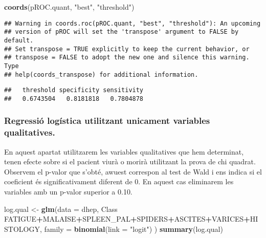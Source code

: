 \documentclass[]{article}
\newenvironment{Shaded}{\begin{snugshade}}{\end{snugshade}}
\newcommand{\DataTypeTok}[1]{\textcolor[rgb]{0.13,0.29,0.53}{#1}}
\newcommand{\KeywordTok}[1]{\textcolor[rgb]{0.13,0.29,0.53}{\textbf{#1}}}
\newcommand{\NormalTok}[1]{#1}
\newcommand{\OperatorTok}[1]{\textcolor[rgb]{0.81,0.36,0.00}{\textbf{#1}}}
\newcommand{\StringTok}[1]{\textcolor[rgb]{0.31,0.60,0.02}{#1}}
\begin{document}
\begin{Shaded}
\begin{Highlighting}[]
\KeywordTok{coords}\NormalTok{(pROC.quant, }\StringTok{"best"}\NormalTok{, }\StringTok{"threshold"}\NormalTok{)}
\end{Highlighting}
\end{Shaded}

\begin{verbatim}
## Warning in coords.roc(pROC.quant, "best", "threshold"): An upcoming
## version of pROC will set the 'transpose' argument to FALSE by default.
## Set transpose = TRUE explicitly to keep the current behavior, or
## transpose = FALSE to adopt the new one and silence this warning. Type
## help(coords_transpose) for additional information.
\end{verbatim}

\begin{verbatim}
##   threshold specificity sensitivity 
##   0.6743504   0.8181818   0.7804878
\end{verbatim}

\hypertarget{regressiuxf3-loguxedstica-utilitzant-unicament-variables-qualitatives.}{%
\subsubsection{Regressió logística utilitzant unicament variables
qualitatives.}\label{regressiuxf3-loguxedstica-utilitzant-unicament-variables-qualitatives.}}

En aquest apartat utilitzarem les variables qualitatives que hem
determinat, tenen efecte sobre si el pacient viurà o morirà utilitzant
la prova de chi quadrat. Observem el p-valor que s'obté, awuest
correspon al test de Wald i ens indica si el coeficient és
significativament diferent de 0. En aquest cas eliminarem les variables
amb un p-valor superior a 0.10.

\begin{Shaded}
\begin{Highlighting}[]
\NormalTok{log.qual <-}\StringTok{ }\KeywordTok{glm}\NormalTok{(}\DataTypeTok{data =}\NormalTok{ dhep, Class}\OperatorTok{~}\StringTok{ }\NormalTok{FATIGUE}\OperatorTok{+}\NormalTok{MALAISE}\OperatorTok{+}\NormalTok{SPLEEN_PAL}\OperatorTok{+}\NormalTok{SPIDERS}\OperatorTok{+}\NormalTok{ASCITES}\OperatorTok{+}\NormalTok{VARICES}\OperatorTok{+}\NormalTok{HISTOLOGY,}
                 \DataTypeTok{family =} \KeywordTok{binomial}\NormalTok{(}\DataTypeTok{link =} \StringTok{"logit"}\NormalTok{) )}
\KeywordTok{summary}\NormalTok{(log.qual)}
\end{Highlighting}
\end{Shaded}
\end{document}
